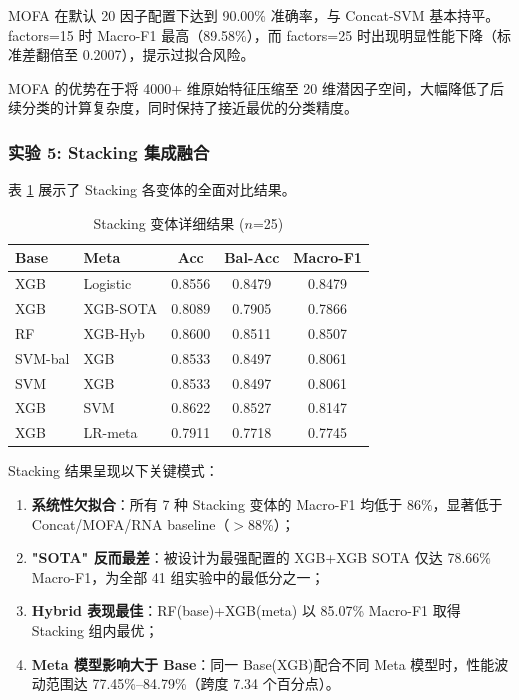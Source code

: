 MOFA 在默认 20 因子配置下达到 90.00\% 准确率，与 Concat-SVM 基本持平。factors=15 时 Macro-F1 最高（89.58\%），而 factors=25 时出现明显性能下降（标准差翻倍至 0.2007），提示过拟合风险。

MOFA 的优势在于将 4000+ 维原始特征压缩至 20 维潜因子空间，大幅降低了后续分类的计算复杂度，同时保持了接近最优的分类精度。

\subsubsection{实验 5: Stacking 集成融合}

表 \ref{tab:stacking_results} 展示了 Stacking 各变体的全面对比结果。

\begin{table}[htbp]
\centering
\small
\caption{Stacking 变体详细结果 ($n$=25)}
\label{tab:stacking_results}
\begin{tabular}{|ll|ccc|}
\hline
\textbf{Base} & \textbf{Meta} & \textbf{Acc} & \textbf{Bal-Acc} & \textbf{Macro-F1} \\
\hline
XGB & Logistic & 0.8556 & 0.8479 & 0.8479 \\
XGB & XGB-SOTA & 0.8089 & 0.7905 & 0.7866 \\
RF & XGB-Hyb & 0.8600 & 0.8511 & 0.8507 \\
SVM-bal & XGB & 0.8533 & 0.8497 & 0.8061 \\
SVM & XGB & 0.8533 & 0.8497 & 0.8061 \\
XGB & SVM & 0.8622 & 0.8527 & 0.8147 \\
XGB & LR-meta & 0.7911 & 0.7718 & 0.7745 \\
\hline
\end{tabular}
\end{table}

Stacking 结果呈现以下关键模式：

\begin{enumerate}
    \item \textbf{系统性欠拟合}：所有 7 种 Stacking 变体的 Macro-F1 均低于 86\%，显著低于 Concat/MOFA/RNA baseline（$>$88\%）；
    \item \textbf{"SOTA" 反而最差}：被设计为最强配置的 XGB+XGB SOTA 仅达 78.66\% Macro-F1，为全部 41 组实验中的最低分之一；
    \item \textbf{Hybrid 表现最佳}：RF(base)+XGB(meta) 以 85.07\% Macro-F1 取得 Stacking 组内最优；
    \item \textbf{Meta 模型影响大于 Base}：同一 Base(XGB)配合不同 Meta 模型时，性能波动范围达 77.45\%--84.79\%（跨度 7.34 个百分点）。
\end{enumerate}

